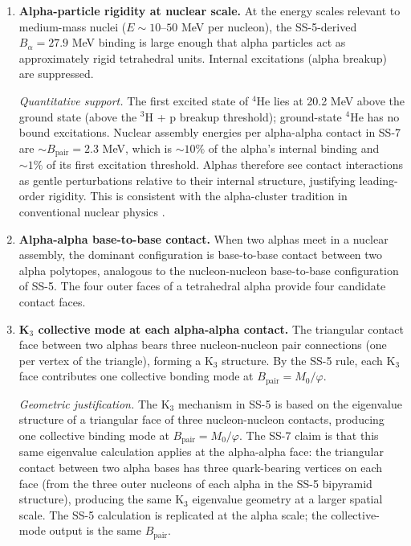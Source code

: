 \documentclass[11pt,letterpaper]{article}
\newcommand{\phig}{\varphi}
\newcommand{\Mzero}{M_0}
\newcommand{\Bpair}{B_{\mathrm{pair}}}
\newcommand{\Balpha}{B_{\alpha}}
\begin{document}
\begin{enumerate}[label=(C\arabic*)]
\item \textbf{Alpha-particle rigidity at nuclear scale.} At the energy scales relevant to medium-mass nuclei ($E \sim 10$--$50$ MeV per nucleon), the SS-5-derived $\Balpha = 27.9$ MeV binding is large enough that alpha particles act as approximately rigid tetrahedral units. Internal excitations (alpha breakup) are suppressed.

\emph{Quantitative support.} The first excited state of ${}^4$He lies at 20.2 MeV above the ground state (above the $^3$H + p breakup threshold); ground-state ${}^4$He has no bound excitations. Nuclear assembly energies per alpha-alpha contact in SS-7 are $\sim \Bpair = 2.3$ MeV, which is $\sim 10\%$ of the alpha's internal binding and $\sim 1\%$ of its first excitation threshold. Alphas therefore see contact interactions as gentle perturbations relative to their internal structure, justifying leading-order rigidity. This is consistent with the alpha-cluster tradition in conventional nuclear physics \cite{brink1966, ikeda1968, freer_alpha}.

\item \textbf{Alpha-alpha base-to-base contact.} When two alphas meet in a nuclear assembly, the dominant configuration is base-to-base contact between two alpha polytopes, analogous to the nucleon-nucleon base-to-base configuration of SS-5. The four outer faces of a tetrahedral alpha provide four candidate contact faces.

\item \textbf{K$_3$ collective mode at each alpha-alpha contact.} The triangular contact face between two alphas bears three nucleon-nucleon pair connections (one per vertex of the triangle), forming a K$_3$ structure. By the SS-5 rule, each K$_3$ face contributes one collective bonding mode at $\Bpair = \Mzero/\phig$.

\emph{Geometric justification.} The K$_3$ mechanism in SS-5 is based on the eigenvalue structure of a triangular face of three nucleon-nucleon contacts, producing one collective binding mode at $\Bpair = M_0/\varphi$. The SS-7 claim is that this same eigenvalue calculation applies at the alpha-alpha face: the triangular contact between two alpha bases has three quark-bearing vertices on each face (from the three outer nucleons of each alpha in the SS-5 bipyramid structure), producing the same K$_3$ eigenvalue geometry at a larger spatial scale. The SS-5 calculation is replicated at the alpha scale; the collective-mode output is the same $\Bpair$.


\end{enumerate}
\end{document}
